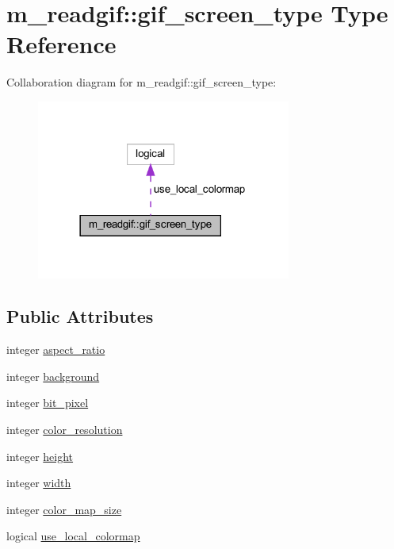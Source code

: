 \hypertarget{structm__readgif_1_1gif__screen__type}{}\section{m\+\_\+readgif\+:\+:gif\+\_\+screen\+\_\+type Type Reference}
\label{structm__readgif_1_1gif__screen__type}


Collaboration diagram for m\+\_\+readgif\+:\+:gif\+\_\+screen\+\_\+type\+:
\nopagebreak
\begin{figure}[H]
\begin{center}
\leavevmode
\includegraphics[width=237pt]{structm__readgif_1_1gif__screen__type__coll__graph}
\end{center}
\end{figure}
\subsection*{Public Attributes}
\begin{DoxyCompactItemize}
\item 
integer \hyperlink{structm__readgif_1_1gif__screen__type_ab6ae805198c2ec45439be3be1b6f1b98}{aspect\+\_\+ratio}
\item 
integer \hyperlink{structm__readgif_1_1gif__screen__type_a4a31d71ea239de86a385139081f941ba}{background}
\item 
integer \hyperlink{structm__readgif_1_1gif__screen__type_aabb35d3c3029216c0fc92275be788107}{bit\+\_\+pixel}
\item 
integer \hyperlink{structm__readgif_1_1gif__screen__type_ab658d452e13761e1df0ca41584b3473e}{color\+\_\+resolution}
\item 
integer \hyperlink{structm__readgif_1_1gif__screen__type_a98828d2f71961cdc398ec567846e9da4}{height}
\item 
integer \hyperlink{structm__readgif_1_1gif__screen__type_adea440e7648df26d475a1c1531108a29}{width}
\item 
integer \hyperlink{structm__readgif_1_1gif__screen__type_a42c5ab97168acf1f1b9fef9f86fc5393}{color\+\_\+map\+\_\+size}
\item 
logical \hyperlink{structm__readgif_1_1gif__screen__type_af6ecd153af2e29d040055fa6dd92c671}{use\+\_\+local\+\_\+colormap}
\end{DoxyCompactItemize}


